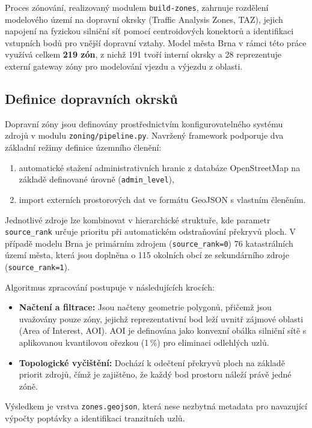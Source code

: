 Proces zónování, realizovaný modulem \texttt{build-zones}, zahrnuje rozdělení modelového území na dopravní okrsky (Traffic Analysis Zones, TAZ), jejich napojení na fyzickou silniční síť pomocí centroidových konektorů a identifikaci vstupních bodů pro vnější dopravní vztahy. Model města Brna v rámci této práce využívá celkem \textbf{219 zón}, z nichž 191 tvoří interní okrsky a 28 reprezentuje externí gateway zóny pro modelování vjezdu a výjezdu z oblasti.

\subsection{Definice dopravních okrsků}
\label{sec:impl-zones-definition}

Dopravní zóny jsou definovány prostřednictvím konfigurovatelného systému zdrojů v modulu \texttt{zoning/pipeline.py}. Navržený framework podporuje dva základní režimy definice územního členění:
\begin{enumerate}[label=(\alph*)]
    \item automatické stažení administrativních hranic z databáze OpenStreetMap na základě definované úrovně (\texttt{admin\_level}),
    \item import externích prostorových dat ve formátu GeoJSON s vlastním členěním.
\end{enumerate}

Jednotlivé zdroje lze kombinovat v hierarchické struktuře, kde parametr \texttt{source\_rank} určuje prioritu při automatickém odstraňování překryvů ploch. V případě modelu Brna je primárním zdrojem (\texttt{source\_rank=0}) 76 katastrálních území města, která jsou doplněna o 115 okolních obcí ze sekundárního zdroje (\texttt{source\_rank=1}).

Algoritmus zpracování postupuje v následujících krocích:
\begin{itemize}
    \item \textbf{Načtení a filtrace:} Jsou načteny geometrie polygonů, přičemž jsou uvažovány pouze zóny, jejichž reprezentativní bod leží uvnitř zájmové oblasti (Area of Interest, AOI). AOI je definována jako konvexní obálka silniční sítě s aplikovanou kvantilovou ořezkou (1\,\%) pro eliminaci odlehlých uzlů.
    \item \textbf{Topologické vyčištění:} Dochází k odečtení překryvů ploch na základě priorit zdrojů, čímž je zajištěno, že každý bod prostoru náleží právě jedné zóně.
\end{itemize}

Výsledkem je vrstva \texttt{zones.geojson}, která nese nezbytná metadata pro navazující výpočty poptávky a identifikaci tranzitních uzlů.

